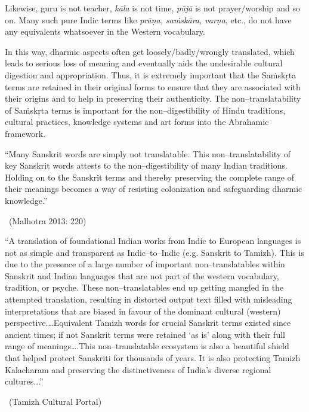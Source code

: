 Likewise, guru is not teacher, \textit{kāla} is not time, \textit{pūjā} is not prayer/worship and so on. Many such pure Indic terms like \textit{prāṇa, saṁskāra, varṇa}, etc., do not have any equivalents whatsoever in the Western vocabulary.

In this way, dharmic aspects often get loosely/badly/wrongly translated, which leads to serious loss of meaning and eventually aids the undesirable cultural digestion and appropriation. Thus, it is extremely important that the Saṁskṛta terms are retained in their original forms to ensure that they are associated with their origins and to help in preserving their authenticity. The non–translatability of Saṁskṛta terms\supskpt{\ref{999–aside.xhtmlid–c2–en2}} is important for the non–digestibility of Hindu traditions, cultural practices, knowledge systems and art forms into the Abrahamic framework.

\begin{myquote}
“Many Sanskrit words are simply not translatable. This non–translatability of key Sanskrit words attests to the non–digestibility of many Indian traditions. Holding on to the Sanskrit terms and thereby preserving the complete range of their meanings becomes a way of resisting colonization and safeguarding dharmic knowledge.” 

~\hfill (Malhotra 2013: 220)
\end{myquote}

\begin{myquote}
“A translation of foundational Indian works from Indic to European languages is not as simple and transparent as Indic–to–Indic (e.g. Sanskrit to Tamizh). This is due to the presence of a large number of important non–translatables within Sanskrit and Indian languages that are not part of the western vocabulary, tradition, or psyche. These non–translatables end up getting mangled in the attempted translation, resulting in distorted output text filled with misleading interpretations that are biased in favour of the dominant cultural (western) perspective.…Equivalent Tamizh words for crucial Sanskrit terms existed since ancient times; if not Sanskrit terms were retained ‘as is’ along with their full range of meanings….This non–translatable ecosystem is also a beautiful shield that helped protect Sanskriti for thousands of years. It is also protecting Tamizh Kalacharam and preserving the distinctiveness of India’s diverse regional cultures...” 

~\hfill (Tamizh Cultural Portal)
\end{myquote}



